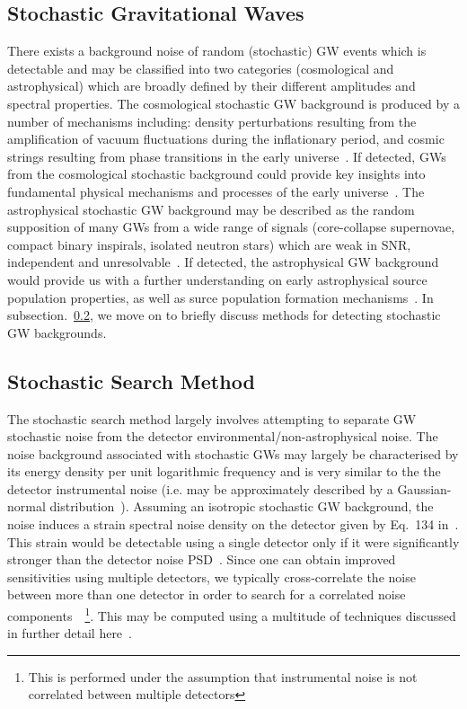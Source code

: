 \subsection{Stochastic Gravitational Waves}\label{sec:stochastic_source}

There exists a background noise of random (stochastic) \ac{GW}
events which 
is detectable and may be classified into two categories (cosmological and 
astrophysical) which are broadly 
defined by their different amplitudes and spectral properties. 
The cosmological stochastic 
\ac{GW} background is produced by a number of mechanisms 
including: density perturbations resulting from the 
amplification of vacuum fluctuations during the inflationary period, and 
cosmic strings resulting from phase transitions in the 
early universe~\cite{2019RPPh...82a6903C,Kandhasamy:2013hba}. 
If detected, \ac{GW}s from the cosmological 
stochastic background could provide key insights into 
fundamental physical mechanisms and processes 
of the early universe~\cite{Caprini_2015}. 
The astrophysical stochastic \ac{GW} background 
may be described as the random 
supposition of many \ac{GW}s from a wide range of 
signals (core-collapse supernovae, 
compact binary inspirals, isolated neutron stars) which are weak in 
\ac{SNR}, 
independent and unresolvable~\cite{Romano2017}. 
If detected, the astrophysical \ac{GW} 
background would provide us with a further understanding on early astrophysical 
source population properties, as well as surce population formation 
mechanisms~\cite{Romano2017}. 
In subsection.~\ref{subsec:stochastic_search}, we move on to briefly discuss 
methods for detecting stochastic \ac{GW} backgrounds.

\subsection{Stochastic Search Method}\label{subsec:stochastic_search}

%
% 
The stochastic search method largely involves attempting to separate
\ac{GW} stochastic noise from the detector 
environmental/non-astrophysical noise. The noise background associated 
with stochastic \ac{GW}s may largely be characterised by its energy 
density per unit logarithmic frequency and is very similar 
to the the detector instrumental noise (i.e. may be approximately 
described by a Gaussian-normal distribution~\cite{Sathyaprakash2009}). 
Assuming an isotropic stochastic \ac{GW} background, the noise 
induces a strain spectral noise density on the detector given 
by Eq.~134 in~\cite{Sathyaprakash2009}.
This strain would be detectable using a single detector only if it were 
significantly stronger than the detector noise \ac{PSD}~\cite{Sathyaprakash2009}. Since one can 
obtain improved sensitivities using multiple detectors, we 
typically cross-correlate the noise 
between more than one detector in order to search for a correlated noise 
components~\cite{PhysRevD.59.102001,2019RPPh...82a6903C}~\footnote{ This 
is performed under the assumption that instrumental noise is not 
correlated between multiple detectors}. This may be computed using 
a multitude of techniques discussed in further 
detail here~\cite{Sathyaprakash2009,PhysRevD.59.102001,2019RPPh...82a6903C,
Romano2017}. 

